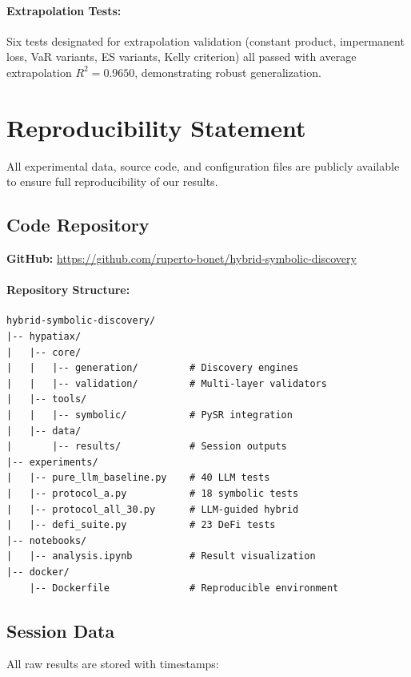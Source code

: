 \documentclass[twoside,11pt]{article}
\begin{document}
\paragraph{Extrapolation Tests:} Six tests designated for extrapolation validation (constant product, impermanent loss, VaR variants, ES variants, Kelly criterion) all passed with average extrapolation $R^2 = 0.9650$, demonstrating robust generalization.

\section{Reproducibility Statement}
\label{app:reproducibility}

All experimental data, source code, and configuration files are publicly available to ensure full reproducibility of our results.

\subsection{Code Repository}

\textbf{GitHub:} \url{https://github.com/ruperto-bonet/hybrid-symbolic-discovery}

\paragraph{Repository Structure:}
\begin{small}
\begin{verbatim}
hybrid-symbolic-discovery/
|-- hypatiax/
|   |-- core/
|   |   |-- generation/         # Discovery engines
|   |   |-- validation/         # Multi-layer validators
|   |-- tools/
|   |   |-- symbolic/           # PySR integration
|   |-- data/
|       |-- results/            # Session outputs
|-- experiments/
|   |-- pure_llm_baseline.py    # 40 LLM tests
|   |-- protocol_a.py           # 18 symbolic tests
|   |-- protocol_all_30.py      # LLM-guided hybrid
|   |-- defi_suite.py           # 23 DeFi tests
|-- notebooks/
|   |-- analysis.ipynb          # Result visualization
|-- docker/
    |-- Dockerfile              # Reproducible environment
\end{verbatim}
\end{small}

\subsection{Session Data}

All raw results are stored with timestamps:
\end{document}
